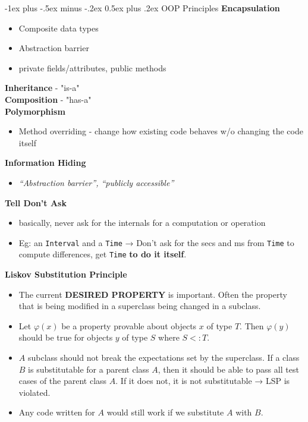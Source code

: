 \documentclass[10pt, landscape]{article}
\makeatletter
\renewcommand{\section}{\@startsection{section}{1}{0mm}%
                                {-1ex plus -.5ex minus -.2ex}%
                                {0.5ex plus .2ex}%
                                {\normalfont\large\bfseries}}
\newcommand{\code}[1]{\textcolor{mygreen}{\texttt{#1}}}
\makeatother
\begin{document}
\begin{multicols}{2}
\section{OOP Principles}
\textbf{Encapsulation}
\begin{itemize}
    \item Composite data types
    \item Abstraction barrier
    \item private fields/attributes, public methods
\end{itemize}
\textbf{Inheritance} - "is-a" \\
\textbf{Composition} - "has-a"\\
\textbf{Polymorphism}
\begin{itemize}
    \item Method overriding - change how existing code behaves w/o changing the code itself
\end{itemize}
\textbf{Information Hiding}
\begin{itemize}
    \item \textit{“Abstraction barrier”, “publicly accessible”}
\end{itemize}
\textbf{Tell Don't Ask}
\begin{itemize}
    \item basically, never ask for the internals for a computation or operation
    \item Eg: an \code{Interval} and a \code{Time} → Don’t ask for the secs and ms from \code{Time} to compute differences, get \code{Time} \textbf{to do it itself}.
\end{itemize}
\textbf{Liskov Substitution Principle}
\begin{itemize}
    \item The current \textbf{DESIRED PROPERTY} is important. Often the property that is being modified in a superclass being changed in a subclass.
    \item Let $\varphi(x)$ be a property provable about objects $x$ of type $T$. Then $\varphi(y)$ should be true for objects $y$ of type $S$ where $S<:T$.
    \item $A$ subclass should not break the expectations set by the superclass. If a class $B$ is substitutable for a parent class $A$, then it should be able to pass all test cases of the parent class $A$. If it does not, it is not substitutable → LSP is violated.
    \item Any code written for $A$ would still work if we substitute $A$ with $B$.
\end{itemize}


\end{multicols}
\end{document}
